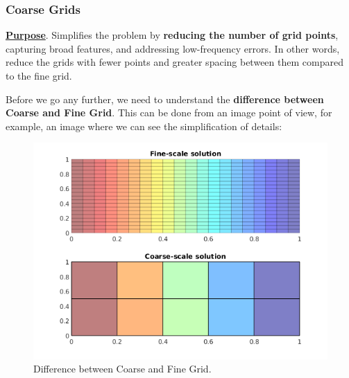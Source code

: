 \subsubsection{Coarse Grids}\label{subsubsection: Coarse Grids}

\textbf{\underline{Purpose}}. Simplifies the problem by \textbf{reducing the number of grid points}, capturing broad features, and addressing low-frequency errors. In other words, reduce the grids with fewer points and greater spacing between them compared to the fine grid.

\highspace
Before we go any further, we need to understand the \textbf{difference between Coarse and Fine Grid}. This can be done from an image point of view, for example, an image where we can see the simplification of details:
\begin{figure}[!htp]
    \centering
    \includegraphics[width=\textwidth]{img/coarsegrid-1.png}
    \caption{Difference between Coarse and Fine Grid.}
\end{figure}

